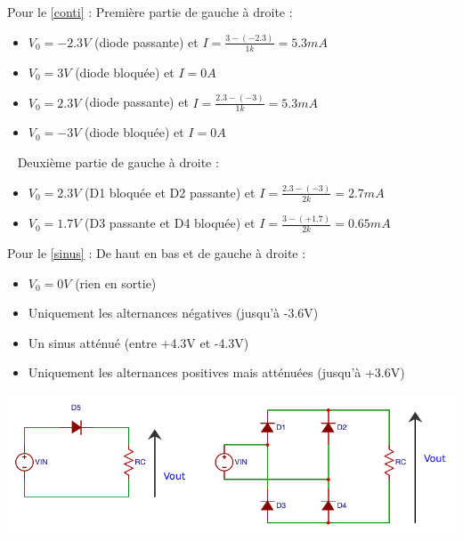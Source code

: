 \documentclass{../template/tp}
\begin{document}
{%
Pour le \ref{conti} :
Première partie de gauche à droite :
\begin{itemize}
    \item $V_0 = -2.3V$ (diode passante) et $I = \frac{3-(-2.3)}{1k}=5.3mA$
    \item $V_0 = 3V$ (diode bloquée) et $I=0A$
    \item $V_0 = 2.3V$ (diode passante) et $I= \frac{2.3-(-3)}{1k}=5.3mA$
    \item $V_0 = -3V$ (diode bloquée) et $I = 0A$
\end{itemize}
~\newline
Deuxième partie de gauche à droite :
\begin{itemize}
    \item $V_0 = 2.3V$ (D1 bloquée et D2 passante) et $I = \frac{2.3-(-3)}{2k} = 2.7mA$
    \item $V_0 = 1.7V$ (D3 passante et D4 bloquée) et $I = \frac{3-(+1.7)}{2k} = 0.65mA$
\end{itemize}

Pour le \ref{sinus} :
De haut en bas et de gauche à droite :
    \begin{itemize}
        \item $V_0 = 0V$ (rien en sortie)
        \item Uniquement les alternances négatives (jusqu'à -3.6V)
        \item Un sinus atténué (entre +4.3V et -4.3V)
        \item Uniquement les alternances positives mais atténuées (jusqu'à +3.6V)
    \end{itemize}

}

{%
\begin{center}
    \includegraphics[width=\linewidth]{redr}
\end{center}
}
\end{document}
